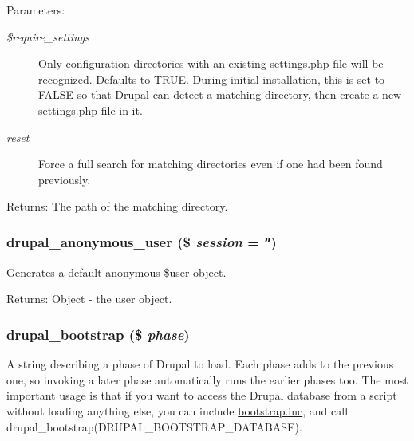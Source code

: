 \begin{Desc}
\item[Parameters:]
\begin{description}
\item[{\em \$require\_\-settings}]Only configuration directories with an existing settings.php file will be recognized. Defaults to TRUE. During initial installation, this is set to FALSE so that Drupal can detect a matching directory, then create a new settings.php file in it. \item[{\em reset}]Force a full search for matching directories even if one had been found previously. \end{description}
\end{Desc}
\begin{Desc}
\item[Returns:]The path of the matching directory. \end{Desc}
\hypertarget{bootstrap_8inc_e529fccbab60752dd4f91acc6b7fce06}{
\subsubsection[{drupal\_\-anonymous\_\-user}]{\setlength{\rightskip}{0pt plus 5cm}drupal\_\-anonymous\_\-user (\$ {\em session} = {\tt ''})}}
\label{bootstrap_8inc_e529fccbab60752dd4f91acc6b7fce06}


Generates a default anonymous \$user object.

\begin{Desc}
\item[Returns:]Object - the user object. \end{Desc}
\hypertarget{bootstrap_8inc_878e64af36fcd5f173b07ae57b07ea10}{
\subsubsection[{drupal\_\-bootstrap}]{\setlength{\rightskip}{0pt plus 5cm}drupal\_\-bootstrap (\$ {\em phase})}}
\label{bootstrap_8inc_878e64af36fcd5f173b07ae57b07ea10}


A string describing a phase of Drupal to load. Each phase adds to the previous one, so invoking a later phase automatically runs the earlier phases too. The most important usage is that if you want to access the Drupal database from a script without loading anything else, you can include \hyperlink{bootstrap_8inc}{bootstrap.inc}, and call drupal\_\-bootstrap(DRUPAL\_\-BOOTSTRAP\_\-DATABASE).

